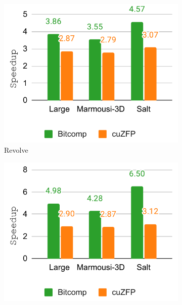 \documentclass[Ingles]{ic-tese-v3}
\begin{document}
\begin{figure}[h!]
    \centering

    \begin{subfigure}[b]{0.33\textwidth}
        \includegraphics[width=\textwidth]{figures/compress_speedup/speedup_compress_revolve.pdf}
        \caption{Revolve}
        \label{fig:compress_speedup_revolve}
    \end{subfigure}
    \hfill
    \begin{subfigure}[b]{0.33\textwidth}
        \includegraphics[width=\textwidth]{figures/compress_speedup/speedup_compress_zcut.pdf}

\end{subfigure}
\end{figure}
\end{document}
